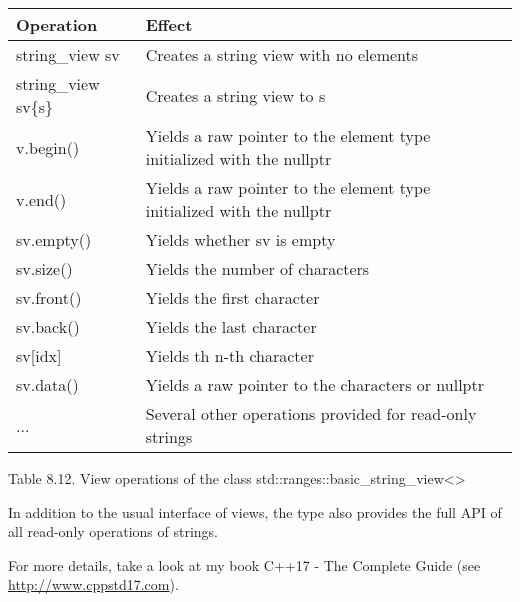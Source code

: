 \begin{longtable}[c]{|l|l|}
\hline
\textbf{Operation}   & \textbf{Effect}                                                       \\ \hline
\endfirsthead
%
\endhead
%
string\_view sv      & Creates a string view with no elements                                \\ \hline
string\_view sv\{s\} & Creates a string view to s                                            \\ \hline
v.begin()            & Yields a raw pointer to the element type initialized with the nullptr \\ \hline
v.end()              & Yields a raw pointer to the element type initialized with the nullptr \\ \hline
sv.empty()           & Yields whether sv is empty                                            \\ \hline
sv.size()            & Yields the number of characters                                       \\ \hline
sv.front()           & Yields the first character                                            \\ \hline
sv.back()            & Yields the last character                                             \\ \hline
sv{[}idx{]}          & Yields th n-th character                                              \\ \hline
sv.data()            & Yields a raw pointer to the characters or nullptr                     \\ \hline
...                  & Several other operations provided for read-only strings               \\ \hline
\end{longtable}

\begin{center}
Table 8.12. View operations of the class std::ranges::basic\_string\_view<>
\end{center}

In addition to the usual interface of views, the type also provides the full API of all read-only operations of strings.

For more details, take a look at my book C++17 - The Complete Guide (see \url{http://www.cppstd17.com}).

